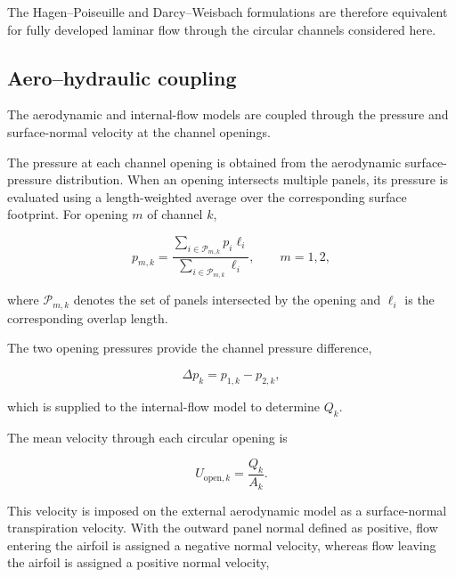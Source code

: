 \documentclass[a4paper,fleqn]{cas-dc}
\begin{document}
The Hagen--Poiseuille and Darcy--Weisbach formulations are therefore
equivalent for fully developed laminar flow through the circular
channels considered here.



\subsection{Aero--hydraulic coupling}
\label{subsec:aero_hydraulic_coupling}

The aerodynamic and internal-flow models are coupled through the
pressure and surface-normal velocity at the channel openings.

The pressure at each channel opening is obtained from the aerodynamic
surface-pressure distribution. When an opening intersects multiple
panels, its pressure is evaluated using a length-weighted average over
the corresponding surface footprint. For opening $m$ of channel $k$,

\begin{equation}
	p_{m,k}
	=
	\frac{
		\displaystyle
		\sum_{i\in\mathcal{P}_{m,k}}
		p_i\ell_i}
	{
		\displaystyle
		\sum_{i\in\mathcal{P}_{m,k}}
		\ell_i},
	\qquad
	m=1,2,
	\label{eq:opening_pressure}
\end{equation}

where $\mathcal{P}_{m,k}$ denotes the set of panels intersected by the
opening and $\ell_i$ is the corresponding overlap length.

The two opening pressures provide the channel pressure difference,

\begin{equation}
	\Delta p_k
	=
	p_{1,k}
	-
	p_{2,k},
\end{equation}

which is supplied to the internal-flow model to determine $Q_k$.

The mean velocity through each circular opening is

\begin{equation}
	U_{\mathrm{open},k}
	=
	\frac{Q_k}{A_k}.
	\label{eq:opening_velocity}
\end{equation}

This velocity is imposed on the external aerodynamic model as a
surface-normal transpiration velocity. With the outward panel normal
defined as positive, flow entering the airfoil is assigned a negative
normal velocity, whereas flow leaving the airfoil is assigned a
positive normal velocity,
\end{document}
